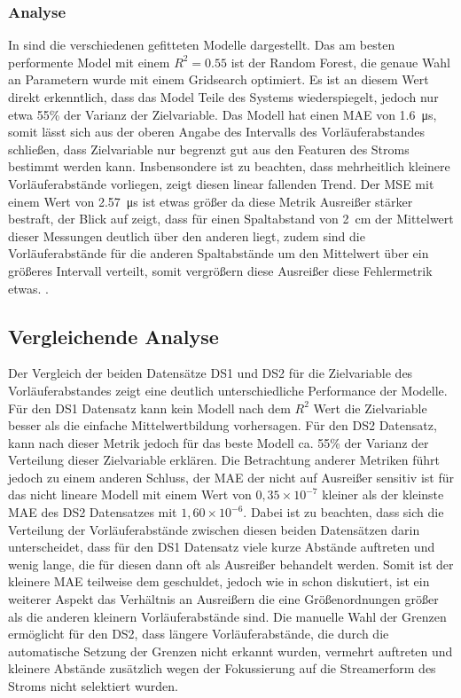 \subsubsection{Analyse}
In  sind die verschiedenen gefitteten Modelle dargestellt. Das am besten performente Model mit einem \(R^2 = 0.55\) ist der Random Forest, die genaue Wahl an Parametern wurde mit einem Gridsearch optimiert. Es ist an diesem Wert direkt erkenntlich, dass das Model Teile des Systems wiederspiegelt, jedoch nur etwa 55\% der Varianz der Zielvariable. Das Modell hat einen MAE von \SI{1,6}{\micro\second}, somit lässt sich aus der oberen Angabe des Intervalls des Vorläuferabstandes schließen, dass Zielvariable nur begrenzt gut aus den Featuren des Stroms  bestimmt werden kann. Insbensondere ist zu beachten, dass mehrheitlich kleinere Vorläuferabstände vorliegen,  zeigt diesen linear fallenden Trend. Der MSE mit einem Wert von \SI{2,57}{\micro\second} ist etwas größer da diese Metrik Ausreißer stärker bestraft, der Blick auf  zeigt, dass für einen Spaltabstand von \SI{2}{\centi\meter} der Mittelwert dieser Messungen deutlich über den anderen liegt, zudem sind die Vorläuferabstände für die anderen Spaltabstände um den Mittelwert über ein größeres Intervall verteilt, somit vergrößern diese Ausreißer diese Fehlermetrik etwas.
.

\subsection{Vergleichende Analyse}
Der Vergleich der beiden Datensätze DS1 und DS2 für die Zielvariable des Vorläuferabstandes zeigt eine deutlich unterschiedliche Performance der Modelle. Für den DS1 Datensatz kann kein Modell nach dem \(R^2\) Wert die Zielvariable besser als die einfache Mittelwertbildung vorhersagen. Für den DS2 Datensatz, kann nach dieser Metrik jedoch für das beste Modell ca. 55\% der Varianz der Verteilung dieser Zielvariable erklären. Die Betrachtung anderer Metriken führt jedoch zu einem anderen Schluss, der MAE der nicht auf Ausreißer sensitiv ist für das nicht lineare Modell mit einem Wert von \(0{,}35 \times 10^{-7}\) kleiner als der kleinste MAE des DS2 Datensatzes mit \(1{,}60 \times 10^{-6}\). Dabei ist zu beachten, dass sich die Verteilung der Vorläuferabstände zwischen diesen beiden Datensätzen darin unterscheidet, dass für den DS1 Datensatz viele kurze Abstände auftreten und wenig lange, die für diesen dann oft als Ausreißer behandelt werden. Somit ist der kleinere MAE teilweise dem geschuldet, jedoch wie in  schon diskutiert, ist ein weiterer Aspekt das Verhältnis an Ausreißern die eine Größenordnungen größer als die anderen kleinern Vorläuferabstände sind. Die manuelle Wahl der Grenzen ermöglicht für den DS2, dass längere Vorläuferabstände, die durch die automatische Setzung der Grenzen nicht erkannt wurden, vermehrt auftreten und kleinere Abstände zusätzlich wegen der Fokussierung auf die Streamerform des Stroms nicht selektiert wurden.

